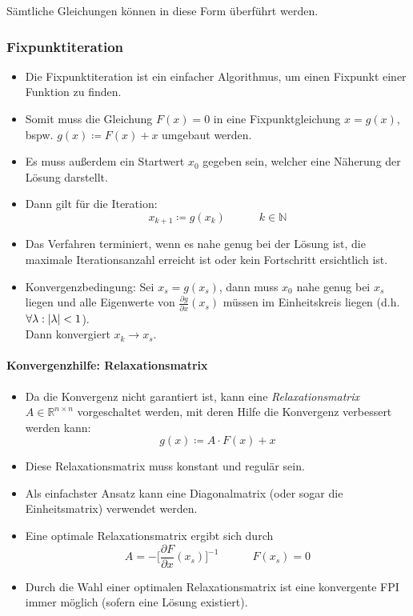 			Sämtliche Gleichungen können in diese Form überführt werden.

		\subsubsection{Fixpunktiteration} %
			\begin{itemize}
				\item Die Fixpunktiteration ist ein einfacher Algorithmus, um einen Fixpunkt einer Funktion zu finden.
				\item Somit muss die Gleichung \( F(x) = 0 \) in eine Fixpunktgleichung \( x = g(x) \), bspw. \( g(x) \coloneqq F(x) + x \) umgebaut werden.
				\item Es muss außerdem ein Startwert \( x _ 0 \) gegeben sein, welcher eine Näherung der Lösung darstellt.
				\item Dann gilt für die Iteration:
					\begin{equation*}
						x_ { k + 1 } \coloneqq g(x _ k) \quad\quad\quad k \in \mathbb{N}
					\end{equation*}
				\item Das Verfahren terminiert, wenn es nahe genug bei der Lösung ist, die maximale Iterationsanzahl erreicht ist oder kein Fortschritt ersichtlich ist.
				\item Konvergenzbedingung: Sei \( x _ s = g(x _ s) \), dann muss \( x _ 0 \) nahe genug bei \( x _ s \) liegen und alle Eigenwerte von \( \frac{\partial g}{\partial x} (x _ s) \) müssen im Einheitskreis liegen (d.h. \( \forall \lambda : \abs{\lambda} < 1 \)). \\ Dann konvergiert \( x _ k \rightarrow x _ s \).
			\end{itemize}

			\paragraph{Konvergenzhilfe: Relaxationsmatrix} %
				\begin{itemize}
					\item Da die Konvergenz nicht garantiert ist, kann eine \textit{Relaxationsmatrix} \( A \in \mathbb{R} ^ { n \times n } \) vorgeschaltet werden, mit deren Hilfe die Konvergenz verbessert werden kann:
						\begin{equation*}
							g(x) \coloneqq A \cdot F(x) + x
						\end{equation*}
					\item Diese Relaxationsmatrix muss konstant und regulär sein.
					\item Als einfachster Ansatz kann eine Diagonalmatrix (oder sogar die Einheitsmatrix) verwendet werden.
					\item Eine optimale Relaxationsmatrix ergibt sich durch
						\begin{equation*}
							A = -\bigg[\frac{\partial F}{\partial x} (x _ s)\bigg] ^ {-1} \quad\quad\quad F(x _ s) = 0
						\end{equation*}
					\item Durch die Wahl einer optimalen Relaxationsmatrix ist eine konvergente FPI immer möglich (sofern eine Lösung existiert).
				\end{itemize}

